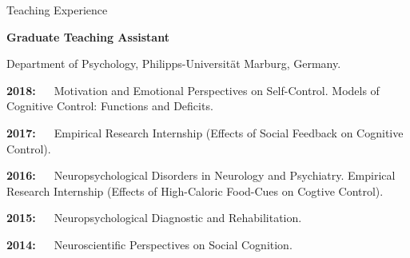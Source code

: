 \begin{rubric}{Teaching Experience}


\textbf{Graduate Teaching Assistant} \par Department of Psychology, Philipps-Universit\"at Marburg, Germany. \par

\vspace{5pt}
\mbox{\textbf{2018: ~ }}Motivation and Emotional Perspectives on Self-Control. 
\newline Models of Cognitive Control: Functions and Deficits.

\vspace{5pt}
\mbox{\textbf{2017: ~ }}Empirical Research Internship (Effects of Social Feedback on Cognitive Control).

\vspace{5pt}
\mbox{\textbf{2016: ~ }}Neuropsychological Disorders in Neurology and Psychiatry. 
\newline Empirical Research Internship (Effects of High-Caloric Food-Cues on Cogtive Control).

\vspace{5pt}
\mbox{\textbf{2015: ~ }}Neuropsychological Diagnostic and Rehabilitation.

\vspace{5pt}
\mbox{\textbf{2014: ~ }}Neuroscientific Perspectives on Social Cognition.

\end{rubric}
